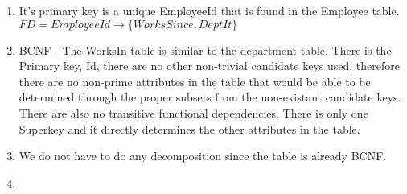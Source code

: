 \documentclass{article}
\begin{document}
  \begin{enumerate}[label=\roman*]
  	\item It's primary key is a unique EmployeeId that is found in the Employee table. \newline
    $FD = EmployeeId \rightarrow \{WorksSince, DeptIt\}$
  	\item BCNF - The WorksIn table is similar to the department table. There is the Primary key, Id, there are no other non-trivial candidate keys used, therefore there are no non-prime attributes in the table that would be able to be determined through the proper subsets from the non-existant candidate keys. There are also no transitive functional dependencies. There is only one Superkey and it directly determines the other attributes in the table.
  	\item We do not have to do any decomposition since the table is already BCNF.
  	\item
  \end{enumerate}
\end{document}
